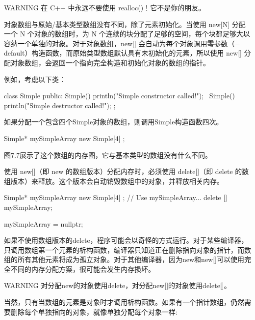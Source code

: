 \begin{myWarning}{WARNING}
在 C++ 中永远不要使用 realloc()！它不是你的朋友。
\end{myWarning}


对象数组与原始/基本类型数组没有不同，除了元素初始化。当使用 new[N] 分配一个 N 个对象的数组时，为 N 个连续的块分配了足够的空间，每个块都足够大以容纳一个单独的对象。对于对象数组，new[] 会自动为每个对象调用零参数（= default）构造函数，而原始类型数组默认具有未初始化的元素，所以使用 new[] 分配对象数组，会返回一个指向完全构造和初始化对象的数组的指针。

例如，考虑以下类：

\begin{cpp}
class Simple
{
    public:
        Simple() { println("Simple constructor called!"); }
        ~Simple() { println("Simple destructor called!"); }
};
\end{cpp}

如果分配一个包含四个Simple对象的数组，则调用Simple构造函数四次。

\begin{cpp}
Simple* mySimpleArray { new Simple[4] };
\end{cpp}

图7.7展示了这个数组的内存图，它与基本类型的数组没有什么不同。



使用 new[]（即 new 的数组版本）分配内存时，必须使用 delete[]（即 delete 的数组版本）来释放。这个版本会自动销毁数组中的对象，并释放相关内存。

\begin{cpp}
Simple* mySimpleArray { new Simple[4] };
// Use mySimpleArray...
delete [] mySimpleArray;

mySimpleArray = nullptr;
\end{cpp}

如果不使用数组版本的delete，程序可能会以奇怪的方式运行。对于某些编译器，只调用数组第一个元素的析构函数，编译器只知道正在删除指向对象的指针，而数组的所有其他元素将成为孤立对象。对于其他编译器，因为new和new[]可以使用完全不同的内存分配方案，很可能会发生内存损坏。

\begin{myWarning}{WARNING}
对分配new的对象使用delete，对分配new[]的对象使用delete[]。
\end{myWarning}

当然，只有当数组的元素是对象时才调用析构函数。如果有一个指针数组，仍然需要删除每个单独指向的对象，就像单独分配每个对象一样:

